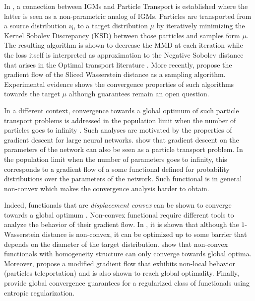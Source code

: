 In \cite{Mroueh:2019}, a connection between IGMs and Particle Transport is established where the latter is seen as a non-parametric analog of IGMs. Particles are transported from a source distribution $\nu_0$ to a target distribution $\mu$ by iteratively minimizing the Kernel Sobolev Discrepancy (KSD) between those particles and samples form $\mu$. The resulting algorithm is shown to decrease the MMD at each iteration while the loss itself is interpreted as approximation to the Negative Sobolev distance that arises in the Optimal transport literature \cite{Otto:2000,Villani:2009,Peyre:2011}.
More recently, \cite{csimcsekli2018sliced} propose the gradient flow of the Sliced Wasserstein distance as a sampling algorithm. 
Experimental evidence shows the convergence properties of such algorithms towards the target $\mu$ although guarantees remain an open question.

In a different context, convergence towards a global optimum of such particle transport problems is addressed in the population limit when the number of particles goes to infinity  \cite{rotskoff2018neural,chizat2018global,mei2018mean,sirignano2018mean}. Such analyses are motivated by the properties of gradient descent for large neural networks. \cite{rotskoff2019global} show that gradient descent on the parameters of the network can also be seen as a particle transport problem. In the population limit when the number of parameters goes to infinity, this corresponds to a gradient flow of a some functional defined for probability distributions over the parameters of the network. %
Such functional is in general non-convex which makes the convergence analysis harder to obtain.

Indeed,  functionals  that are \textit{displacement convex} can be shown to converge towards a global optimum \cite{Villani:2004}. Non-convex functional require different tools to analyze the behavior of their gradient flow. In \cite{Bottou:2017}, it is shown that although the $1$-Wasserstein distance is non-convex, it can be optimized up to some barrier that depends on the diameter of the target distribution.    
\cite{chizat2018global} show that non-convex functionals with homogeneity structure can only converge towards global optima. Moreover, \cite{rotskoff2019global} propose a modified gradient flow that exhibits non-local behavior (particles teleportation) and is also shown to reach global optimality. Finally, \cite{mei2018mean} provide global convergence guarantees for a regularized class of functionals using entropic regularization. 

